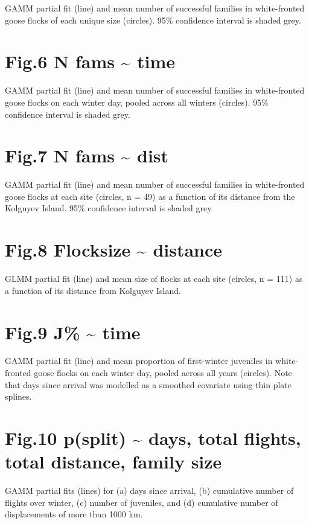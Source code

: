 \documentclass[]{article}
\begin{document}
GAMM partial fit (line) and mean number of successful families in
white-fronted goose flocks of each unique size (circles). 95\%
confidence interval is shaded grey.

\section{Fig.6 N fams \textasciitilde{} time}\label{fig.6-n-fams-time}

GAMM partial fit (line) and mean number of successful families in
white-fronted goose flocks on each winter day, pooled across all winters
(circles). 95\% confidence interval is shaded grey.

\section{Fig.7 N fams \textasciitilde{} dist}\label{fig.7-n-fams-dist}

GAMM partial fit (line) and mean number of successful families in
white-fronted goose flocks at each site (circles, n = 49) as a function
of its distance from the Kolguyev Island. 95\% confidence interval is
shaded grey.

\section{Fig.8 Flocksize \textasciitilde{}
distance}\label{fig.8-flocksize-distance}

GLMM partial fit (line) and mean size of flocks at each site (circles, n
= 111) as a function of its distance from Kolguyev Island.

\section{Fig.9 J\% \textasciitilde{} time}\label{fig.9-j-time}

GAMM partial fit (line) and mean proportion of first-winter juveniles in
white-fronted goose flocks on each winter day, pooled across all years
(circles). Note that days since arrival was modelled as a smoothed
covariate using thin plate splines.

\section{Fig.10 p(split) \textasciitilde{} days, total flights, total
distance, family
size}\label{fig.10-psplit-days-total-flights-total-distance-family-size}

GAMM partial fits (lines) for (a) days since arrival, (b) cumulative
number of flights over winter, (c) number of juveniles, and (d)
cumulative number of displacements of more than 1000 km.
\end{document}
